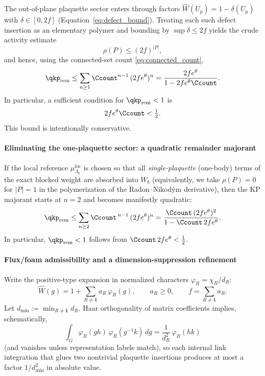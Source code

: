 The out-of-plane plaquette sector enters through factors $\widehat W(U_p)=1-\delta(U_p)$ with $\delta\in[0,2f]$ (Equation~\eqref{eq:defect_bound}).
Treating each such defect insertion as an elementary polymer and bounding by $\sup\delta\le 2f$ yields the crude activity estimate
\begin{equation}\label{eq:rho_crude}
\rho(P)\le (2f)^{|P|},
\end{equation}
and hence, using the connected-set count \eqref{eq:connected_count},
\begin{equation}\label{eq:qrem_crude}
\qkp_{\mathrm{rem}}
\le
\sum_{n\ge 1} \Ccount^{n-1}\,(2f e^{\theta})^{n}
=
\frac{2f e^{\theta}}{1-2f e^{\theta}\Ccount}.
\end{equation}
In particular, a sufficient condition for $\qkp_{\mathrm{rem}}<1$ is
\begin{equation}\label{eq:qrem_simple_sufficient}
2f e^{\theta}\Ccount<\tfrac12.
\end{equation}
This bound is intentionally conservative.


\paragraph*{Eliminating the one-plaquette sector: a quadratic remainder majorant}

If the local reference $\mu^{\mathrm{loc}}_{\Lambda_b}$ is chosen so that all \emph{single-plaquette} (one-body) terms of the exact blocked weight are absorbed into $W_b$ (equivalently, we take $\rho(P)=0$ for $|P|=1$ in the polymerization of the Radon--Nikod\'ym derivative), then the KP majorant starts at $n=2$ and becomes manifestly quadratic:
\begin{equation}\label{eq:qrem_ge2}
\qkp_{\mathrm{rem}}
\le
\sum_{n\ge 2}\Ccount^{\,n-1}\,(2f e^{\theta})^{n}
=
\frac{\Ccount\,(2f e^{\theta})^{2}}{1-\Ccount\,2f e^{\theta}}.
\end{equation}
In particular, $\qkp_{\mathrm{rem}}<1$ follows from $\Ccount\,2f e^{\theta}<\tfrac12$.

\paragraph*{Flux/foam admissibility and a dimension-suppression refinement}

Write the positive-type expansion in normalized characters $\varphi_R=\chi_R/d_R$:
\[
\widehat W(g)=1+\sum_{R\ne \mathbf 1} a_R\,\varphi_R(g),\qquad a_R\ge 0,\qquad f=\sum_{R\ne\mathbf 1} a_R.
\]
Let $d_{\min}:=\min_{R\ne\mathbf 1} d_R$.
Haar orthogonality of matrix coefficients implies, schematically,
\[
\int_G \varphi_R(g h)\,\varphi_R(g^{-1}k)\,dg=\frac{1}{d_R^2}\,\varphi_R(hk)
\]
(and vanishes unless representation labels match), so each internal link integration that glues two nontrivial plaquette insertions produces at most a factor $1/d_{\min}^2$ in absolute value.

